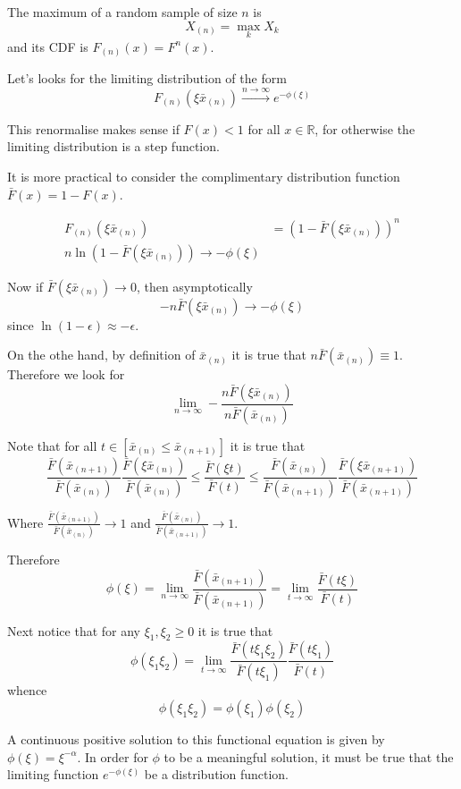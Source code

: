 \documentclass[a4paper]{article}
\newcommand{\clo}[1]{{\left [ #1 \right ]}}
\newcommand{\brac}[1]{{\left ( #1 \right )}}
\newcommand{\Real}{\mathbb{R}}
\begin{document}
The maximum of a random sample of size $n$ is \[X_{(n)} = \max_k X_k\] and its CDF is $F_{(n)}(x) = F^n(x)$.

Let's looks for the limiting distribution of the form 
\[F_{(n)}(\xi \bar{x}_{(n)}) \overset{n\to \infty}{\to} e^{-\phi(\xi)} \]

This renormalise makes sense if $F(x)<1$ for all $x\in \Real$, for otherwise the limiting distribution is a step function.

It is more practical to consider the complimentary distribution function $\bar{F}(x) = 1-F(x)$.

\begin{align*}
	F_{(n)}(\xi \bar{x}_{(n)}) &= \brac{1-\bar{F}(\xi \bar{x}_{(n)})}^n\\
	n \ln\brac{1-\bar{F}(\xi \bar{x}_{(n)})} \to -\phi(\xi)
\end{align*}

Now if $\bar{F}(\xi \bar{x}_{(n)})\to 0$, then asymptotically 
\[- n \bar{F}(\xi \bar{x}_{(n)}) \to -\phi(\xi)\]
since $\ln (1-\epsilon)\approx -\epsilon$.

On the othe hand, by definition of $\bar{x}_{(n)}$ it is true that $
n\bar{F}(\bar{x}_{(n)}) \equiv 1$. Therefore we look for
\[\lim_{n\to \infty} - \frac{n \bar{F}(\xi \bar{x}_{(n)})}{ n\bar{F}(\bar{x}_{(n)}) }\]

Note that for all $t\in \clo{ \bar{x}_{(n)}\leq \bar{x}_{(n+1)}}$ it is true that 
\[
\frac{\bar{F}(\bar{x}_{(n+1)})}{ \bar{F}(\bar{x}_{(n)}) } \frac{\bar{F}(\xi \bar{x}_{(n)})}{ \bar{F}(\bar{x}_{(n)}) } \leq
\frac{\bar{F}(\xi t)}{ \bar{F}(t) } \leq
\frac{\bar{F}(\bar{x}_{(n)})}{ \bar{F}(\bar{x}_{(n+1)}) }
\frac{\bar{F}(\xi \bar{x}_{(n+1)})}{ \bar{F}(\bar{x}_{(n+1)}) }
\]

Where $\frac{\bar{F}(\bar{x}_{(n+1)})}{ \bar{F}(\bar{x}_{(n)}) }\to 1$ and $\frac{\bar{F}(\bar{x}_{(n)})}{ \bar{F}(\bar{x}_{(n+1)}) }\to 1$.

Therefore
\[\phi(\xi) = \lim_{n\to\infty} \frac{\bar{F}(\bar{x}_{(n+1)})}{\bar{F}(\bar{x}_{(n+1)}) } = \lim_{t\to\infty} \frac{\bar{F}(t \xi)}{\bar{F}(t) }\]

Next notice that for any $\xi_1, \xi_2\geq 0$ it is true that
\[\phi(\xi_1\xi_2) = \lim_{t\to\infty} \frac{\bar{F}(t \xi_1\xi_2)}{\bar{F}(t\xi_1) } \frac{\bar{F}(t \xi_1)}{\bar{F}(t) }\]
whence \[\phi(\xi_1\xi_2) = \phi(\xi_1)\phi(\xi_2)\]

A continuous positive solution to this functional equation is given by $\phi(\xi) = \xi^{-\alpha}$.
In order for $\phi$ to be a meaningful solution, it must be true that the limiting function $e^{-\phi(\xi)}$ be a distribution function.
\end{document}
